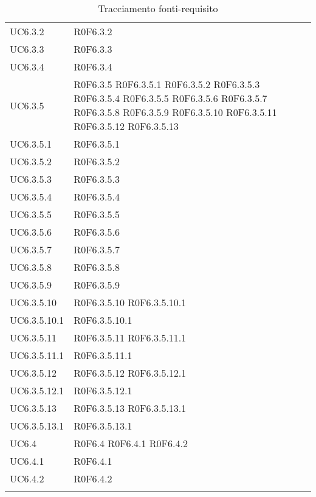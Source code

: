 \begin{longtable}{p{2.5cm}!{\VRule[1pt]}p{5.5cm}}
UC6.3.2 & R0F6.3.2\\
UC6.3.3 & R0F6.3.3\\
UC6.3.4 & R0F6.3.4\\
UC6.3.5 & R0F6.3.5
	\newline R0F6.3.5.1
	\newline R0F6.3.5.2
	\newline R0F6.3.5.3
	\newline R0F6.3.5.4
	\newline R0F6.3.5.5
	\newline R0F6.3.5.6
	\newline R0F6.3.5.7
	\newline R0F6.3.5.8
	\newline R0F6.3.5.9
	\newline R0F6.3.5.10
	\newline R0F6.3.5.11
	\newline R0F6.3.5.12
	\newline R0F6.3.5.13\\
UC6.3.5.1 & R0F6.3.5.1\\
UC6.3.5.2 & R0F6.3.5.2\\
UC6.3.5.3 & R0F6.3.5.3\\
UC6.3.5.4 & R0F6.3.5.4\\
UC6.3.5.5 & R0F6.3.5.5\\
UC6.3.5.6 & R0F6.3.5.6\\
UC6.3.5.7 & R0F6.3.5.7\\
UC6.3.5.8 & R0F6.3.5.8\\
UC6.3.5.9 & R0F6.3.5.9\\
UC6.3.5.10 & R0F6.3.5.10
	\newline R0F6.3.5.10.1\\
UC6.3.5.10.1 & R0F6.3.5.10.1\\
UC6.3.5.11 & R0F6.3.5.11
	\newline R0F6.3.5.11.1\\
UC6.3.5.11.1 & R0F6.3.5.11.1\\
UC6.3.5.12 & R0F6.3.5.12
	\newline R0F6.3.5.12.1\\
UC6.3.5.12.1 & R0F6.3.5.12.1\\
UC6.3.5.13 & R0F6.3.5.13
	\newline R0F6.3.5.13.1\\
UC6.3.5.13.1 & R0F6.3.5.13.1\\
UC6.4 & R0F6.4
	\newline R0F6.4.1
	\newline R0F6.4.2\\
UC6.4.1 & R0F6.4.1\\
UC6.4.2 & R0F6.4.2\\

\caption{Tracciamento fonti-requisito}
\end{longtable}